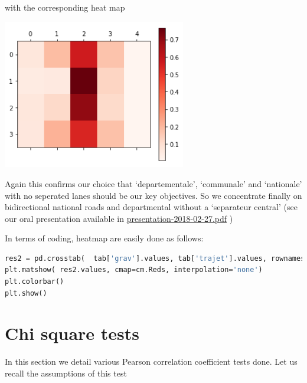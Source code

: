 \documentclass[a4paper]{article}
\theoremstyle{definition}
\theoremstyle{proposition}
\begin{document}
with the corresponding heat map


\includegraphics[width=8cm]{heatmap_roads_category_circ.png}\label{heatmap_roads_category_circ}

Again this confirms our choice that `departementale', `communale' and `nationale' with no seperated lanes should be our key objectives. So we concentrate finally on bidirectional national roads and departmental without a `separateur central' (see our oral presentation available in \href{https://github.com/ericbenhamou/MASH_IPJ_2018/blob/master/presentation/presentation-2018-02-27.pdf}{presentation-2018-02-27.pdf} )

\newpage

In terms of coding, heatmap are easily done as follows:

\begin{lstlisting}[language=Python]
res2 = pd.crosstab(  tab['grav'].values, tab['trajet'].values, rownames =['gravite'],...)
plt.matshow( res2.values, cmap=cm.Reds, interpolation='none')
plt.colorbar()
plt.show()
\end{lstlisting}

\section{Chi square tests}
In this section we detail various Pearson correlation coefficient  tests done. Let us recall the assumptions of this test
\end{document}
